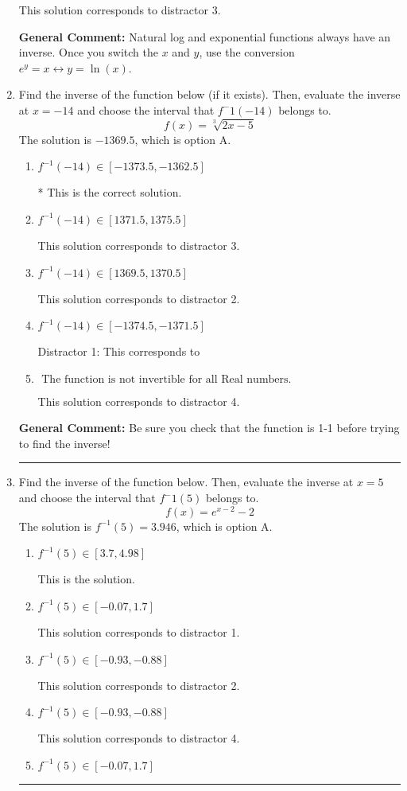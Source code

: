 \documentclass{extbook}[14pt]
\newcommand{\litem}[1]{\item #1

\rule{\textwidth}{0.4pt}}
\begin{document}
\begin{enumerate}
{\begin{enumerate}[label=\Alph*.]
 This solution corresponds to distractor 3.
\end{enumerate}

\textbf{General Comment:} Natural log and exponential functions always have an inverse. Once you switch the $x$ and $y$, use the conversion $ e^y = x \leftrightarrow y=\ln(x)$.
}
\litem{
Find the inverse of the function below (if it exists). Then, evaluate the inverse at $x = -14$ and choose the interval that $f^-1(-14)$ belongs to.
\[ f(x) = \sqrt[3]{2 x - 5} \]The solution is \( -1369.5 \), which is option A.\begin{enumerate}[label=\Alph*.]
\item \( f^{-1}(-14) \in [-1373.5, -1362.5] \)

* This is the correct solution.
\item \( f^{-1}(-14) \in [1371.5, 1375.5] \)

 This solution corresponds to distractor 3.
\item \( f^{-1}(-14) \in [1369.5, 1370.5] \)

 This solution corresponds to distractor 2.
\item \( f^{-1}(-14) \in [-1374.5, -1371.5] \)

 Distractor 1: This corresponds to 
\item \( \text{ The function is not invertible for all Real numbers. } \)

 This solution corresponds to distractor 4.
\end{enumerate}

\textbf{General Comment:} Be sure you check that the function is 1-1 before trying to find the inverse!
}
\litem{
Find the inverse of the function below. Then, evaluate the inverse at $x = 5$ and choose the interval that $f^-1(5)$ belongs to.
\[ f(x) = e^{x-2}-2 \]The solution is \( f^{-1}(5) = 3.946 \), which is option A.\begin{enumerate}[label=\Alph*.]
\item \( f^{-1}(5) \in [3.7, 4.98] \)

 This is the solution.
\item \( f^{-1}(5) \in [-0.07, 1.7] \)

 This solution corresponds to distractor 1.
\item \( f^{-1}(5) \in [-0.93, -0.88] \)

 This solution corresponds to distractor 2.
\item \( f^{-1}(5) \in [-0.93, -0.88] \)

 This solution corresponds to distractor 4.
\item \( f^{-1}(5) \in [-0.07, 1.7] \)


\end{enumerate}}
\end{enumerate}
\end{document}
